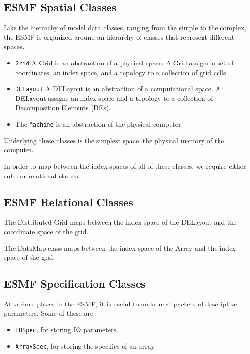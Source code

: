 \subsection{ESMF Spatial Classes}

Like the hierarchy of model data classes, ranging from the 
simple to the complex, the ESMF is organized around an hierarchy of 
classes that represent different spaces.

\begin{itemize}
\item {\tt Grid}  A Grid is an abstraction of a physical space.  
A Grid assigns a set of coordinates, an index space, and a topology 
to a collection of grid cells. 
\item {\tt DELayout}  A DELayout is an abstraction of a computational 
space.  A DELayout assigns an index space and a topology to a 
collection of Decomposition Elements (DEs).
\item The {\tt Machine} is an abstraction of the physical computer.  
\end{itemize} 

Underlying these classes is the simplest space, the physical memory of 
the computer.  

In order to map between the index spaces of all of these classes,
we require either rules or relational classes.

\subsection{ESMF Relational Classes}

The Distributed Grid maps between the index space of the DELayout
and the coordinate space of the grid.

The DataMap class maps between the index space of the Array and
the index space of the grid.

\subsection{ESMF Specification Classes}

At various places in the ESMF, it is useful to make neat packets
of descriptive parameters.  Some of these are:
\begin{itemize}
\item {\tt IOSpec}, for storing IO parameters.
\item {\tt ArraySpec}, for storing the specifics of an array.
\end{itemize}

